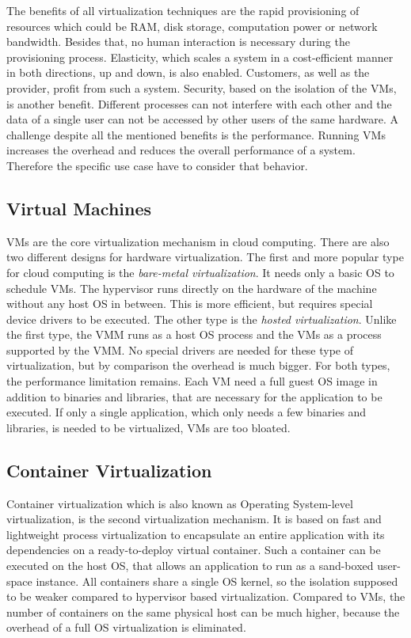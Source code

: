 The benefits of all virtualization techniques are the rapid provisioning of resources which could be \ac{RAM}, disk storage, computation power or network bandwidth.
Besides that, no human interaction is necessary during the provisioning process.
Elasticity, which scales a system in a cost-efficient manner in both directions, up and down, is also enabled.
Customers, as well as the provider, profit from such a system.
Security, based on the isolation of the \acp{VM}, is another benefit.
Different processes can not interfere with each other and the data of a single user can not be accessed by other users of the same hardware.
A challenge despite all the mentioned benefits is the performance.
Running \acp{VM} increases the overhead and reduces the overall performance of a system.
Therefore the specific use case have to consider that behavior.


\subsection{Virtual Machines}
\acp{VM} are the core virtualization mechanism in cloud computing.
There are also two different designs for hardware virtualization.
The first and more popular type for cloud computing is the \textit{bare-metal virtualization}.
It needs only a basic OS to schedule \acp{VM}.
The hypervisor runs directly on the hardware of the machine without any host \ac{OS} in between.
This is more efficient, but requires special device drivers to be executed.
The other type is the \textit{hosted virtualization}.
Unlike the first type, the \ac{VMM} runs as a host \ac{OS} process and the \acp{VM} as a process supported by the \ac{VMM}.
No special drivers are needed for these type of virtualization, but by comparison the overhead is much bigger.
For both types, the performance limitation remains.
Each \ac{VM} need a full guest \ac{OS} image in addition to binaries and libraries, that are necessary for the application to be executed.\autocite[cf.][p. 381]{Pahl:2015}
If only a single application, which only needs a few binaries and libraries, is needed to be virtualized, \acp{VM} are too bloated.


\subsection{Container Virtualization}
Container virtualization which is also known as Operating System-level virtualization, is the second virtualization mechanism.
It is based on fast and lightweight process virtualization to encapsulate an entire application with its dependencies on a ready-to-deploy virtual container.\autocite[cf.][p. 72]{Tosatto:2015}
Such a container can be executed on the host \ac{OS}, that allows an application to run as a sand-boxed user-space instance.\autocite[cf.][p. 1]{Anderson:2016}
All containers share a single \ac{OS} kernel, so the isolation supposed to be weaker compared to hypervisor based virtualization.\autocite[cf.][p. 2]{Celesti:2016}
Compared to \acp{VM}, the number of containers on the same physical host can be much higher, because the overhead of a full \ac{OS} virtualization is eliminated.\autocite[cf.][p. 2]{Celesti:2016}



